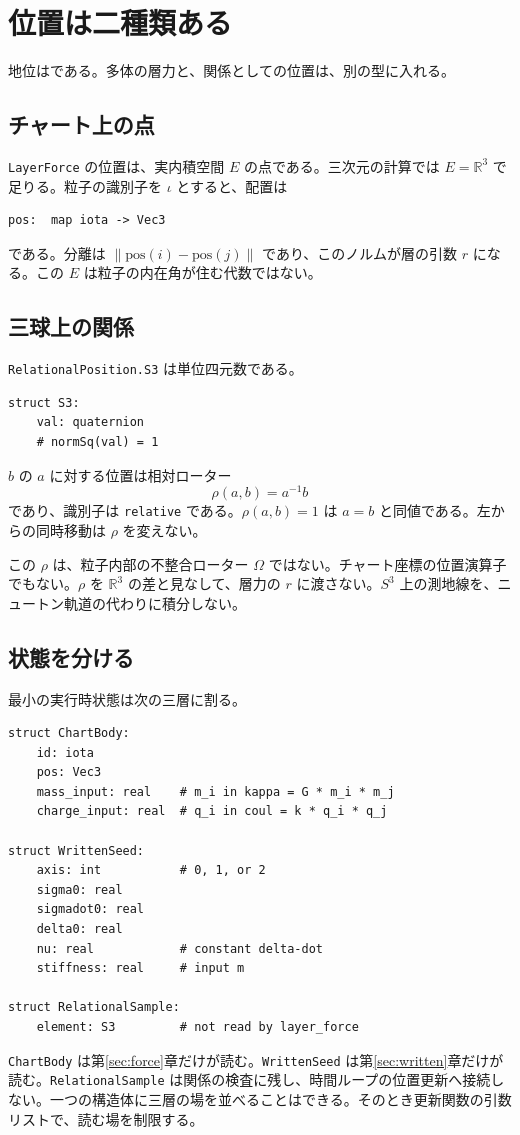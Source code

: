 \section{位置は二種類ある}
\label{sec:position}

地位は\dstrec{}である。多体の層力と、関係としての位置は、別の型に入れる。

\subsection{チャート上の点}

\texttt{LayerForce} の位置は、実内積空間 \(E\) の点である。三次元の計算では \(E=\mathbb{R}^3\) で足りる。粒子の識別子を \(\iota\) とすると、配置は
\begin{verbatim}
pos:  map iota -> Vec3
\end{verbatim}
である。分離は \(\lVert\mathrm{pos}(i)-\mathrm{pos}(j)\rVert\) であり、このノルムが層の引数 \(r\) になる。この \(E\) は粒子の内在角が住む代数ではない。

\subsection{三球上の関係}

\texttt{RelationalPosition.S3} は単位四元数である。
\begin{verbatim}
struct S3:
    val: quaternion
    # normSq(val) = 1
\end{verbatim}
\(b\) の \(a\) に対する位置は相対ローター
\[
\rho(a,b)=a^{-1}b
\]
であり、識別子は \texttt{relative} である。\(\rho(a,b)=1\) は \(a=b\) と同値である。左からの同時移動は \(\rho\) を変えない。

この \(\rho\) は、粒子内部の不整合ローター \(\Omega\) ではない。チャート座標の位置演算子でもない。\(\rho\) を \(\mathbb{R}^3\) の差と見なして、層力の \(r\) に渡さない。\(S^3\) 上の測地線を、ニュートン軌道の代わりに積分しない。

\subsection{状態を分ける}

最小の実行時状態は次の三層に割る。

\begin{verbatim}
struct ChartBody:
    id: iota
    pos: Vec3
    mass_input: real    # m_i in kappa = G * m_i * m_j
    charge_input: real  # q_i in coul = k * q_i * q_j

struct WrittenSeed:
    axis: int           # 0, 1, or 2
    sigma0: real
    sigmadot0: real
    delta0: real
    nu: real            # constant delta-dot
    stiffness: real     # input m

struct RelationalSample:
    element: S3         # not read by layer_force
\end{verbatim}

\texttt{ChartBody} は第\ref{sec:force}章だけが読む。\texttt{WrittenSeed} は第\ref{sec:written}章だけが読む。\texttt{RelationalSample} は関係の検査に残し、時間ループの位置更新へ接続しない。一つの構造体に三層の場を並べることはできる。そのとき更新関数の引数リストで、読む場を制限する。
